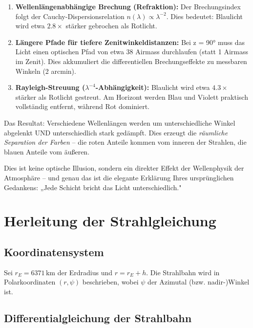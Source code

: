 \documentclass[12pt,a4paper]{article}
\providecommand{\SI}[2]{\ensuremath{#1\,#2}}
\providecommand{\kilo}{\mathrm{k}}
\providecommand{\metre}{\mathrm{m}}
\begin{document}
\begin{enumerate}
	\item \textbf{Wellenlängenabhängige Brechung (Refraktion):}
	Der Brechungsindex folgt der Cauchy-Dispersionsrelation $n(\lambda) \propto \lambda^{-2}$.
	Dies bedeutet: Blaulicht wird etwa $2.8\times$ stärker gebrochen als Rotlicht.
	
	\item \textbf{Längere Pfade für tiefere Zenitwinkeldistanzen:}
	Bei z = 90° muss das Licht einen optischen Pfad von etwa 38 Airmass
	durchlaufen (statt 1 Airmass im Zenit). Dies akkumuliert die differentiellen
	Brechungseffekte zu messbaren Winkeln (2 arcmin).
	
	\item \textbf{Rayleigh-Streuung ($\lambda^{-4}$-Abhängigkeit):}
	Blaulicht wird etwa $4.3\times$ stärker als Rotlicht gestreut.
	Am Horizont werden Blau und Violett praktisch vollständig entfernt,
	während Rot dominiert.
\end{enumerate}

Das Resultat: Verschiedene Wellenlängen werden um unterschiedliche Winkel
abgelenkt UND unterschiedlich stark gedämpft. Dies erzeugt die
\emph{räumliche Separation der Farben} – die roten Anteile kommen vom
inneren der Strahlen, die blauen Anteile vom äußeren.

Dies ist keine optische Illusion, sondern ein direkter Effekt der
Wellenphysik der Atmosphäre – und genau das ist die elegante
Erklärung Ihres ursprünglichen Gedankens: „Jede Schicht bricht das Licht
unterschiedlich."

\section{Herleitung der Strahlgleichung}
\label{sec:strahglgn}

\subsection{Koordinatensystem}

Sei $r_E = \SI{6371}{\kilo\metre}$ der Erdradius und $r = r_E + h$.
Die Strahlbahn wird in Polarkoordinaten $(r, \psi)$ beschrieben,
wobei $\psi$ der Azimutal (bzw. nadir-)Winkel ist.

\subsection{Differentialgleichung der Strahlbahn}
\end{document}
